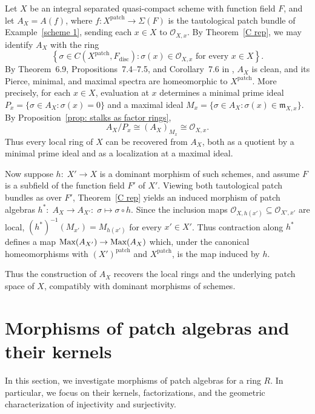 \documentclass[11pt]{amsart}
\begin{document}
\begin{example} 
Let $X$ be an integral separated quasi-compact scheme with function field $F$, and let $A_X=A(f)$, where
$f\colon X^{\mathrm{patch}}\to\Sigma(F)$ is the tautological patch bundle of Example~\ref{scheme 1}, sending each $x\in X$ to $\mathcal O_{X,x}$.
By Theorem~\ref{C rep}, we may identify $A_X$ with the ring
\[
\left\{
\sigma\in C(X^{\mathrm{patch}},F_{\mathrm{disc}}):
\sigma(x)\in\mathcal O_{X,x}
\text{ for every }x\in X
\right\}.
\]
By Theorem~6.9, Propositions~7.4--7.5, and Corollary~7.6 in \cite{CosOlb}, $A_X$ is clean, and its Pierce, minimal, and maximal spectra are homeomorphic to $X^{\mathrm{patch}}$.
More precisely, for each $x\in X$, evaluation at $x$ determines a minimal
prime ideal $P_x=\{\sigma\in A_X:\sigma(x)=0\}$ and a maximal ideal $M_x=\{\sigma\in A_X:\sigma(x)\in\mathfrak m_{X,x}\}$. By Proposition~\ref{prop: stalks as factor rings},
\[
A_X/P_x\cong (A_X)_{M_x}
\cong\mathcal O_{X,x}.
\]
Thus every local ring of $X$ can be recovered from $A_X$, both as a quotient by a minimal prime ideal and as a localization at a maximal ideal.

Now suppose $h\colon\; X'\to X$ is a dominant morphism of such schemes, and assume $F $ is a subfield of the function field $F'$ of $X'$.
Viewing both tautological patch bundles as over $F'$, Theorem~\ref{C rep} yields an induced morphism of patch algebras $h^*\colon\; A_X\rightarrow A_{X'}\colon\; \sigma\mapsto\sigma\circ h.$ Since the inclusion maps $\mathcal O_{X,h(x')}\subseteq\mathcal O_{X',x'}$ are local, $(h^*)^{-1}(M_{x'})=M_{h(x')}$ for every $x'\in X'$. Thus contraction along $h^*$ defines a map $\mbox{\rm Max}(A_{X'})\to\mbox{\rm Max}(A_X)$ which, under the canonical homeomorphisms with $(X')^{\mathrm{patch}}$ and $X^{\mathrm{patch}}$, is the map induced by $h$. 

Thus the construction of $A_X$ recovers the local rings and the underlying patch space of $X$, compatibly with dominant morphisms of schemes.
\end{example}


\section{Morphisms of patch algebras and their kernels}\label{sec: morphisms and kernels}

In this section, we investigate morphisms of patch algebras for a ring $R$. In particular, we focus on their kernels, factorizations,
and the geometric characterization of injectivity and surjectivity.
\end{document}
